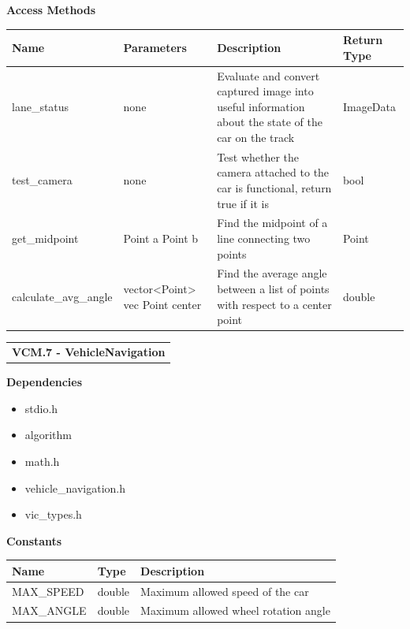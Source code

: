 \documentclass [10pt]{article}
\begin{document}
\textbf{Access Methods}


\begin{longtable}{ p{ }  p{ } p{} p{}} \\ 

\rowcolor{tableCell} \textbf{Name} & \textbf{Parameters} & \textbf{Description} &\textbf{Return Type} \\ \hline

\rowcolor{tableCell} lane\_status & none &  Evaluate and convert captured image into useful information about the state of the car on the track & ImageData \\ \hline

\rowcolor{tableCell} test\_camera & none &  Test whether the camera attached to the car is functional, return true if it is & bool \\ \hline

\rowcolor{tableCell} get\_midpoint & Point a \newline Point b &  Find the midpoint of a line connecting two points & Point \\ \hline

\rowcolor{tableCell} calculate\_avg\_angle & vector<Point> vec \newline Point center &  Find the average angle between a list of points with respect to a center point & double \\ \hline


\end{longtable}



        
        
    





\begin{longtable}{p{}}
\rowcolor{subsectionC}\textbf{VCM.7 - VehicleNavigation} \\
\end{longtable}

\textbf{Dependencies} 
\begin{itemize} 
\itemsep 0em 
\item stdio.h
\item algorithm
\item math.h
\item vehicle\_navigation.h
\item vic\_types.h
\end{itemize}

\textbf{Constants}
\begin{longtable}{ p{ }  p{ } p{}} \\ 

\rowcolor{tableCell} \textbf{Name} & \textbf{Type} & \textbf{Description} \\ \hline
\rowcolor{tableCell} MAX\_SPEED & double & Maximum allowed speed of the car\\ \hline
\rowcolor{tableCell} MAX\_ANGLE & double & Maximum allowed wheel rotation angle\\ \hline


\end{longtable}
\end{document}
